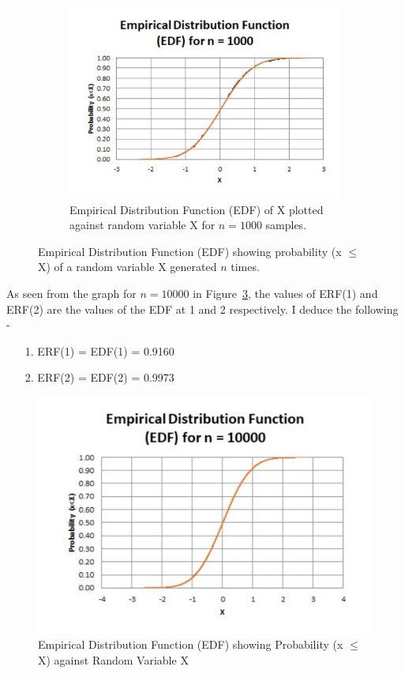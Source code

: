 \documentclass[titlepage, 11pt]{article}
\begin{document}
\begin{figure}[ht]
\begin{subfigure}{.5\textwidth}
\begin{center}
  \includegraphics[width=\linewidth]{EDF1000.pdf}
  \end{center}
  \caption{Empirical Distribution Function (EDF) of X plotted against random variable X for $n=1000$ samples. }
  \label{fig:q33}
\end{subfigure}
\caption{Empirical Distribution Function (EDF) showing probability (x $\leq$ X) of a random variable X generated $n$ times.}
\label{fig:q3}
\end{figure}

As seen from the graph for $n=10000$ in Figure~\ref{fig:q4}, the values of ERF(1) and ERF(2) are the values of the EDF at 1 and 2 respectively. I deduce the following - \\
\begin{itemize}
    \item [1.] ERF(1) = EDF(1) = 0.9160
    \item [2.] ERF(2) = EDF(2) = 0.9973
\end{itemize}
\begin{figure}
    \includegraphics[width=\linewidth]{EDF10000.pdf}
    \caption{Empirical Distribution Function (EDF) showing Probability (x $\leq$ X) against Random Variable X}
    \label{fig:q4}
\end{figure}
\end{document}
